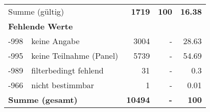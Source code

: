\begin{longtable}{lXrrr}
     \midrule
     \multicolumn{2}{l}{Summe (gültig)} &
       \textbf{\num{1719}} &
     \textbf{\num{100}} &
       \textbf{\num[round-mode=places,round-precision=2]{16.38}} \\
     \multicolumn{5}{l}{\textbf{Fehlende Werte}}\\
       -998 &
       keine Angabe &
         \num{3004} &
        - &
         \num[round-mode=places,round-precision=2]{28.63} \\
       -995 &
       keine Teilnahme (Panel) &
         \num{5739} &
        - &
         \num[round-mode=places,round-precision=2]{54.69} \\
       -989 &
       filterbedingt fehlend &
         \num{31} &
        - &
         \num[round-mode=places,round-precision=2]{0.3} \\
       -966 &
       nicht bestimmbar &
         \num{1} &
        - &
         \num[round-mode=places,round-precision=2]{0.01} \\
     \midrule
     \multicolumn{2}{l}{\textbf{Summe (gesamt)}} &
          \textbf{\num{10494}} &
        \textbf{-} &
        \textbf{\num{100}} \\
     \bottomrule
     \end{longtable}
     
